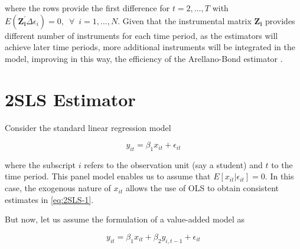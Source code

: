 \documentclass[a4paper, 12pt]{article}
\begin{document}
{%

where the rows provide the first difference for $t=2, \dotsc, T$ with $E(\mathbf{Z_i^{\prime}} \bm{\mathit{\Delta}} \epsilon_{i})=0, \enspace \forall \enspace i=1, \dotsc, N$. Given that the instrumental matrix $\mathbf{Z_i}$ provides different number of instruments for each time period, as the estimators will achieve later time periods, more additional instruments will be integrated in the model, improving in this way, the efficiency of the Arellano-Bond estimator \citep{roodman2009xtabond2, baltagi2008econometric, baum2006introduction}.













\section{2SLS Estimator} \label{2SLS}


Consider the standard linear regression model


\begin{equation} \label{eq:2SLS-1}
y_{it} = \beta_1 x_{it} + \epsilon_{it} 
\end{equation}


where the subscript $i$ refers to the observation unit (say a student) and $t$ to the time period. This panel model enables us to assume that $E[x_{it} \vert \epsilon_{it}] = 0$. In this case, the exogenous nature of $x_{it}$ allows the use of OLS to obtain consistent estimates in \eqref{eq:2SLS-1}. 

But now, let us assume the formulation of a value-added model as


\begin{equation} \label{eq:2SLS-2}
y_{it} = \beta_1 x_{it} + \beta_2 y_{i,t-1} + \epsilon_{it} 
\end{equation}

}
\end{document}
